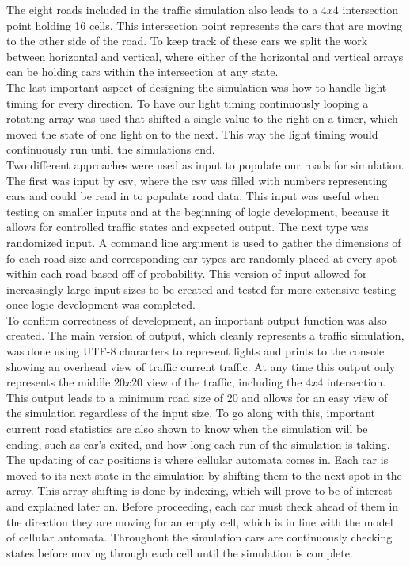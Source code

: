 \documentclass[conference]{IEEEtran}
\begin{document}
The eight roads included in the traffic simulation also leads to a $4x4$ intersection point holding 16 cells. This intersection point represents the cars that are moving to the other side of the road. To keep track of these cars we split the work between horizontal and vertical, where either of the horizontal and vertical arrays can be holding cars within the intersection at any state. \\
The last important aspect of designing the simulation was how to handle light timing for every direction. To have our light timing continuously looping a rotating array was used that shifted a single value to the right on a timer, which moved the state of one light on to the next. This way the light timing would continuously run until the simulations end.\\
\hspace*{.2cm} Two different approaches were used as input to populate our roads for simulation. The first was input by csv, where the csv was filled with numbers representing cars and could be read in to populate road data. This input was useful when testing on smaller inputs and at the beginning of logic development, because it allows for controlled traffic states and expected output. The next type was randomized input. A command line argument is used to gather the dimensions of fo each road size and corresponding car types are randomly placed at every spot within each road based off of probability. This version of input allowed for increasingly large input sizes to be created and tested for more extensive testing once logic development was completed. \\
\hspace*{.2cm} To confirm correctness of development, an important output function was also created. The main version of output, which cleanly represents a traffic simulation, was done using UTF-8 characters to represent lights and prints to the console showing an overhead view of traffic current traffic. At any time this output only represents the middle $20x20$ view of the traffic, including the $4x4$ intersection. This output leads to a minimum road size of 20 and allows for an easy view of the simulation regardless of the input size. To go along with this, important current road statistics are also shown to know when the simulation will be ending, such as car's exited, and how long each run of the simulation is taking.  \\
\hspace*{.2cm} The updating of car positions is where cellular automata comes in. Each car is moved to its next state in the simulation by shifting them to the next spot in the array. This array shifting is done by indexing, which will prove to be of interest and explained later on. Before proceeding, each car must check ahead of them in the direction they are moving for an empty cell, which is in line with the model of cellular automata. Throughout the simulation cars are continuously checking states before moving through each cell until the simulation is complete. \\
\end{document}
